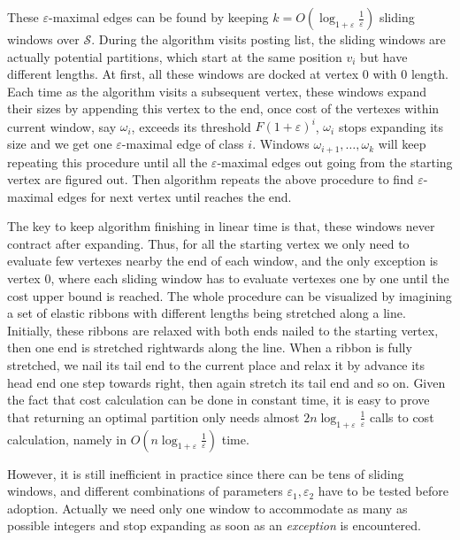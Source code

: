 \documentclass[runningheads,a4paper]{llncs}
\begin{document}
These $\varepsilon$-maximal edges can be found by keeping $k = O\left(\log_{1+\varepsilon}\frac{1}{\varepsilon}\right)$ sliding windows over $\mathcal{S}$.
During the algorithm visits posting list, the sliding windows are actually potential partitions, which start at the same position $ v_{i} $ but have different lengths.
At first, all these windows are docked at vertex 0 with 0 length.
Each time as the algorithm visits a subsequent vertex, these windows expand their sizes by appending this vertex to the end, once cost of the vertexes within current window, say $ \omega_{i} $, exceeds its threshold $ F \left( 1 + \varepsilon \right) ^{i} $, $ \omega_{i} $ stops expanding its size and we get one $\varepsilon$-maximal edge of class $ i $.
Windows $ \omega_{i+1}, \dots, \omega_{k}$ will keep repeating this procedure until all the $\varepsilon$-maximal edges out going from the starting vertex are figured out.
Then algorithm repeats the above procedure to find $\varepsilon$-maximal edges for next vertex until reaches the end.

The key to keep algorithm finishing in linear time is that, these windows never contract after expanding.
Thus, for all the starting vertex we only need to evaluate few vertexes nearby the end of each window, and the only exception is vertex 0, where each sliding window has to evaluate vertexes one by one until the cost upper bound is reached.
The whole procedure can be visualized by imagining a set of elastic ribbons with different lengths being stretched along a line.
Initially, these ribbons are relaxed with both ends nailed to the starting vertex, then one end is stretched rightwards along the line.
When a ribbon is fully stretched, we nail its tail end to the current place and relax it by advance its head end one step towards right, then again stretch its tail end and so on.
Given the fact that cost calculation can be done in constant time, it is easy to prove that returning an optimal partition only needs almost $ 2n\log_{1+\varepsilon}\frac{1}{\varepsilon} $ calls to cost calculation, namely in $O\left(n\log_{1+\varepsilon}\frac{1}{\varepsilon}\right)$ time.

However, it is still inefficient in practice since there can be tens of sliding windows, and different combinations of parameters $ \varepsilon_1,\varepsilon_2 $ have to be tested before adoption.
Actually we need only one window to accommodate as many as possible integers and stop expanding as soon as an \textit{exception} is encountered.
\end{document}

